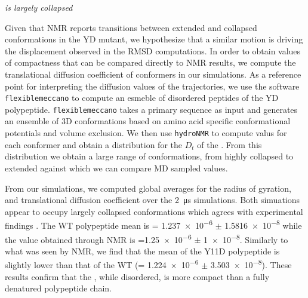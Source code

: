 {\it \gct{} is largely collapsed}

Given that NMR reports transitions between extended and collapsed conformations in the YD mutant, we hypothesize that a similar motion is driving the displacement observed in the RMSD computations. In order to obtain values of compactness that can be compared directly to NMR results, we compute the translational diffusion coefficient of conformers in our simulations. As a reference point for interpreting the diffusion values of the trajectories, we use the software \texttt{flexiblemeccano} to compute an esmeble of disordered peptides of the YD polypeptide. \texttt{flexiblemeccano} takes a primary sequence as input and generates an ensemble of 3D conformations based on amino acid specific conformational potentials and volume exclusion. We then use \texttt{hydroNMR} to compute \diffusion{} valus for each conformer and obtain a distribution for the $D_t$ of the \gct{}. From this distribution  we obtain a large range of conformations, from highly collapsed to extended against which we can compare MD sampled values.

From our simulations, we computed global averages for the radius of gyration, and translational diffusion coefficient over the \SI{2}{\us} simulations. Both simuations appear to occupy largely collapsed conformations which agrees with experimental findings . The WT polypeptide \diffusion mean is \diffusion = \num{1.237e-6} $\pm$ \SI{1.5816e-8}{\dcunits} while the value obtained through NMR is  \diffusion{}=\num{1.25e-6} $\pm$  \SI{1e-8}{\dcunits}. Similarly to what was seen by NMR, we find that the mean \diffusion of the Y11D \gct{} polypeptide is slightly lower than that of the WT \gct{} (\diffusion= \num{1.224e-6} $\pm$ \SI{3.503e-8}{\dcunits}). These results confirm that the \gct{}, while disordered, is more compact than a fully denatured polypeptide chain.





